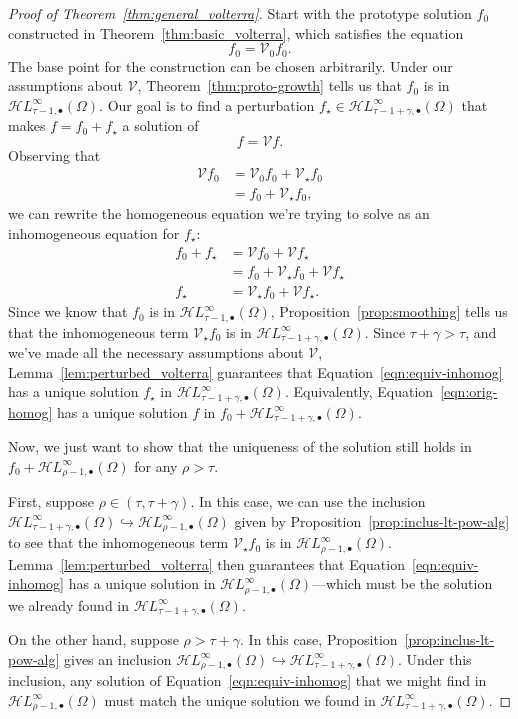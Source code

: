 \documentclass{article}
\theoremstyle{definition}
\theoremstyle{plain}
\newcommand{\singexp}[2]{\mathcal{H}L^\infty_{#1, #2}}
\newcommand{\singexpalg}[1]{\singexp{#1}{\bullet}}
\newcommand{\volterra}{\mathcal{V}}
\newcommand{\hardpart}{\mathcal{V}_0}
\newcommand{\softpart}{\mathcal{V}_\star}
\newcommand{\solwhole}{f}
\newcommand{\solproto}{f_0}
\newcommand{\solptb}{f_\star}
\newcommand{\domain}{\Omega}
\begin{document}
\begin{proof}[Proof of Theorem~\ref{thm:general_volterra}]
Start with the prototype solution $\solproto$ constructed in Theorem~\ref{thm:basic_volterra}, which satisfies the equation
\[ \solproto = \hardpart \solproto. \]
The base point for the construction can be chosen arbitrarily. Under our assumptions about $\volterra$, Theorem~\ref{thm:proto-growth} tells us that $\solproto$ is in $\singexpalg{\tau-1}(\domain)$. Our goal is to find a perturbation $\solptb \in \singexpalg{\tau-1+\gamma}(\domain)$ that makes $\solwhole = \solproto + \solptb$ a solution of
\begin{equation}\label{eqn:orig-homog}
\solwhole = \volterra \solwhole.
\end{equation}
Observing that
\begin{align*}
\volterra \solproto & = \hardpart\solproto + \softpart\solproto \\
& = \solproto + \softpart \solproto,
\end{align*}
we can rewrite the homogeneous equation we're trying to solve as an inhomogeneous equation for $\solptb$:
\begin{align}
\solproto + \solptb & = \volterra\solproto + \volterra\solptb \nonumber \\
& = \solproto + \softpart\solproto + \volterra\solptb \nonumber \\
\solptb & = \softpart\solproto + \volterra\solptb. \label{eqn:equiv-inhomog}
\end{align}
Since we know that $\solproto$ is in $\singexpalg{\tau-1}(\domain)$, Proposition~\ref{prop:smoothing} tells us that the inhomogeneous term $\softpart\solproto$ is in $\singexpalg{\tau-1+\gamma}(\domain)$. Since $\tau+\gamma > \tau$, and we've made all the necessary assumptions about $\volterra$, Lemma~\ref{lem:perturbed_volterra} guarantees that Equation~\eqref{eqn:equiv-inhomog} has a unique solution $\solptb$ in $\singexpalg{\tau-1+\gamma}(\Omega)$. Equivalently, Equation~\eqref{eqn:orig-homog} has a unique solution $f$ in $f_0 + \singexpalg{\tau-1+\gamma}(\domain)$.

Now, we just want to show that the uniqueness of the solution still holds in $f_0 + \singexpalg{\rho-1}(\Omega)$ for any $\rho > \tau$.

First, suppose $\rho \in (\tau, \tau+\gamma)$. In this case, we can use the inclusion $\singexpalg{\tau-1+\gamma}(\Omega) \hookrightarrow \singexpalg{\rho-1}(\Omega)$ given by Proposition~\ref{prop:inclus-lt-pow-alg} to see that the inhomogeneous term $\softpart\solproto$ is in $\singexpalg{\rho-1}(\Omega)$. Lemma~\ref{lem:perturbed_volterra} then guarantees that Equation~\eqref{eqn:equiv-inhomog} has a unique solution in $\singexpalg{\rho-1}(\Omega)$---which must be the solution we already found in $\singexpalg{\tau-1+\gamma}(\Omega)$.

On the other hand, suppose $\rho > \tau+\gamma$. In this case, Proposition~\ref{prop:inclus-lt-pow-alg} gives an inclusion $\singexpalg{\rho-1}(\Omega) \hookrightarrow \singexpalg{\tau-1+\gamma}(\Omega)$. Under this inclusion, any solution of Equation~\eqref{eqn:equiv-inhomog} that we might find in $\singexpalg{\rho-1}(\Omega)$ must match the unique solution we found in $\singexpalg{\tau-1+\gamma}(\Omega)$.
\end{proof}
\end{document}
